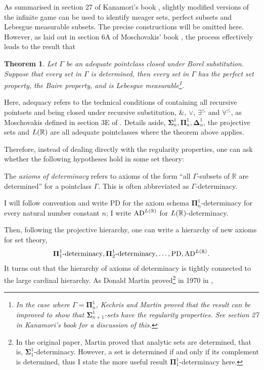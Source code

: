\documentclass[12pt]{article}
\theoremstyle{plain}
\newtheorem{theorem}{Theorem}[section]
\theoremstyle{definition}
\newcommand{\PD}{\mathrm{PD}}
\newcommand{\AD}{\mathrm{AD}}
\begin{document}
As summarised in section 27 of Kanamori's book \cite{higher-infinite}, slightly modified versions of the infinite game can be used to identify meager sets, perfect subsets and Lebesgue measurable subsets. The precise constructions will be omitted here. However, as laid out in section 6A of Moschovakis' book \cite{descriptive-set-theory}, the process effectively leads to the result that

\begin{theorem}
	Let $\Gamma$ be an adequate pointclass closed under Borel substitution. Suppose that every set in $\Gamma$ is determined, then every set in $\Gamma$ has the perfect set property, the Baire property, and is Lebesgue measurable\footnote{In the case where $\Gamma = \boldsymbol\Pi^1_n$, Kechris and Martin proved that the result can be improved to show that $\boldsymbol\Sigma^1_{n + 1}$-sets have the regularity properties. See section 27 in Kanamori's book \cite{higher-infinite} for a discussion of this.}.
\end{theorem}

Here, adequacy refers to the technical conditions of containing all recursive pointsets and being closed under recursive substitution, $\&$, $\lor$, $\exists^\leq$ and $\forall^\leq$, as Moschovakis defined in section 3E of \cite{descriptive-set-theory}. Details aside, $\boldsymbol\Sigma^1_n, \boldsymbol\Pi^1_n, \boldsymbol\Delta^1_n$, the projective sets and $L\mleft(\mathbb{R}\mright)$ are all adequate pointclasses where the theorem above applies.

Therefore, instead of dealing directly with the regularity properties, one can ask whether the following hypotheses hold in some set theory:

\begin{definition}
	The \emph{axioms of determinacy} refers to axioms of the form ``all $\Gamma$-subsets of $\mathbb{R}$ are determined'' for a pointclass $\Gamma$. This is often abbreviated as $\Gamma$-determinacy.

	I will follow convention and write $\PD$ for the axiom schema $\boldsymbol\Pi^1_n$-determinacy for every natural number constant $n$; I write $\AD^{L\mleft(\mathbb{R}\mright)}$ for $L\mleft(\mathbb{R}\mright)$-determinacy.
\end{definition}

Then, following the projective hierarchy, one can write a hierarchy of new axioms for set theory,
\[\text{$\boldsymbol\Pi^1_1$-determinacy}, \text{$\boldsymbol\Pi^1_2$-determinacy}, \ldots, \PD, \AD^{L\mleft(\mathbb{R}\mright)}.\]
It turns out that the hierarchy of axioms of determinacy is tightly connected to the large cardinal hierarchy. As Donald Martin proved\footnote{In the original paper, Martin proved that analytic sets are determined, that is, $\boldsymbol\Sigma^1_1$-determinacy. However, a set is determined if and only if its complement is determined, thus I state the more useful result $\boldsymbol\Pi^1_1$-determinacy here.} in 1970 in \cite{martin-measurable-cardinal-determinacy},
\end{document}
